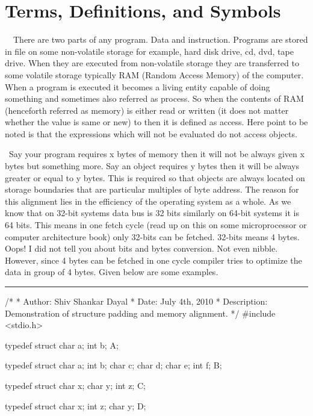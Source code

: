 \section{Terms, Definitions, and Symbols}
\startitemize[n]
\item{}\textreference[access]~~There are two parts of any
program. Data and
instruction. Programs are stored in file on some non-volatile storage for
example, hard disk drive, cd, dvd, tape drive. When they are executed
from non-volatile storage they are transferred to some volatile
storage typically RAM (Random Access Memory) of the computer. When a
program is executed it becomes a living entity capable of doing
something and sometimes also referred as process. So when the contents
of RAM (henceforth referred as memory) is either read or written (it
does not matter whether the value is same or new) to then it is
defined as access. Here point to be noted is that the expressions
which will not be evaluated do not access objects.
\item{}\textreference[alignment]~Say your program
  requires x bytes of memory then it will not be always given x bytes
  but something more. Say an object requires y bytes then it will be
  always greater or equal to y bytes. This is required so that objects
  are always located on storage boundaries that are particular
  multiples of byte address. The reason for this alignment lies in
  the efficiency of the operating system as a whole. As we know that
  on 32-bit systems data bus is 32 bits similarly on 64-bit systems
  it is 64 bits. This means in one fetch cycle (read up on this on
  some microprocessor or computer architecture book) only 32-bits
  can be fetched. 32-bits means 4 bytes. Oops! I did not tell you
  about bits and bytes conversion. Not even nibble. However, since 4
  bytes can be fetched in one cycle compiler tries to optimize the
  data in group of 4 bytes. Given below are some examples.
\blank[force,1mm]\hrule\blank[force,1mm]
\startCPP
/*
 * Author: Shiv Shankar Dayal
 * Date: July 4th, 2010
 * Description: Demonstration of structure padding and memory alignment.
 */
#include <stdio.h>

typedef struct
{
  char a;
  int b;
}A;

typedef struct
{
  char a;
  int b;
  char c;
  char d;
  char e;
  int f;
}B;

typedef struct 
{
  char x;
  char y;
  int z;
}C;

typedef struct 
{
  char x;
  int z;
  char y;
}D;

